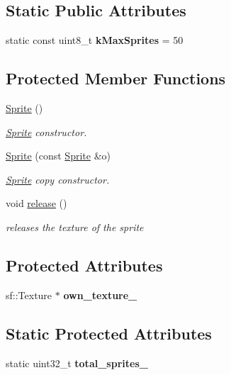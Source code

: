 \subsection*{Static Public Attributes}
\begin{DoxyCompactItemize}
\item 
\mbox{\label{class_sprite_a9f565e1571739b17c22760fa99289d2a}} 
static const uint8\+\_\+t {\bfseries k\+Max\+Sprites} = 50
\end{DoxyCompactItemize}
\subsection*{Protected Member Functions}
\begin{DoxyCompactItemize}
\item 
\hyperlink{class_sprite_a12cba3ac1868418add3c4d95ce87e615}{Sprite} ()
\begin{DoxyCompactList}\small\item\em \hyperlink{class_sprite}{Sprite} constructor. \end{DoxyCompactList}\item 
\hyperlink{class_sprite_aa5cb9fac0cfa5d81dc429e75137179d0}{Sprite} (const \hyperlink{class_sprite}{Sprite} \&o)
\begin{DoxyCompactList}\small\item\em \hyperlink{class_sprite}{Sprite} copy constructor. \end{DoxyCompactList}\item 
void \hyperlink{class_sprite_af339355dcf2af5b7d97f6a5d95f4a54b}{release} ()
\begin{DoxyCompactList}\small\item\em releases the texture of the sprite \end{DoxyCompactList}\end{DoxyCompactItemize}
\subsection*{Protected Attributes}
\begin{DoxyCompactItemize}
\item 
\mbox{\label{class_sprite_adc21e288d7f99213c4b0ef37eaa58353}} 
sf\+::\+Texture $\ast$ {\bfseries own\+\_\+texture\+\_\+}
\end{DoxyCompactItemize}
\subsection*{Static Protected Attributes}
\begin{DoxyCompactItemize}
\item 
\mbox{\label{class_sprite_a1fc1356f60c3d969a5f4cf6b70759e0e}} 
static uint32\+\_\+t {\bfseries total\+\_\+sprites\+\_\+}
\end{DoxyCompactItemize}

